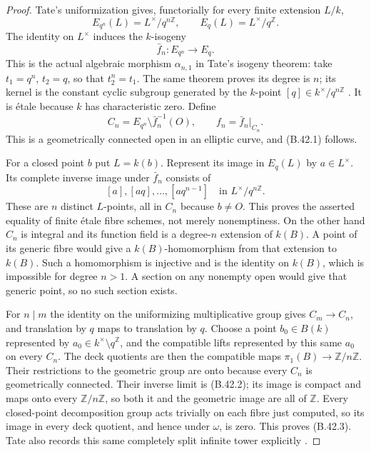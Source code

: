 \begin{proof}
Tate's uniformization gives, functorially for
every finite extension $L/k$,
\[
 E_{q^n}(L)=L^\times/q^{n\mathbb Z},
 \qquad E_q(L)=L^\times/q^{\mathbb Z}.
\]
The identity on $L^\times$ induces the
$k$-isogeny
\[
 \bar f_n:E_{q^n}\longrightarrow E_q.
\]
This is the actual algebraic morphism
$\alpha_{n,1}$ in Tate's isogeny theorem:
take $t_1=q^n$, $t_2=q$, so that
$t_2^n=t_1$. The same theorem proves its
degree is $n$; its kernel is the constant
cyclic subgroup generated by the $k$-point
$[q]\in k^\times/q^{n\mathbb Z}$
\cite[Theorem 1 and the isogeny theorem]{B_TateUniformization}.
It is \'etale because $k$ has characteristic
zero. Define
\[
 C_n=E_{q^n}\setminus\bar f_n^{-1}(O),
 \qquad f_n=\bar f_n|_{C_n}.
\]
This is a geometrically connected open in
an elliptic curve, and (B.42.1) follows.

For a closed point $b$ put $L=k(b)$.
Represent its image in $E_q(L)$ by
$a\in L^\times$. Its complete inverse image
under $\bar f_n$ consists of
\[
 [a], [aq],\ldots,[aq^{n-1}]
             \quad\text{in }L^\times/q^{n\mathbb Z}.
\]
These are $n$ distinct $L$-points, all in
$C_n$ because $b\ne O$. This proves the
asserted equality of finite \'etale fibre
schemes, not merely nonemptiness.
On the other hand $C_n$ is integral and its
function field is a degree-$n$ extension
of $k(B)$. A point of its generic fibre would
give a $k(B)$-homomorphism from that extension
to $k(B)$. Such a homomorphism is injective
and is the identity on $k(B)$, which is
impossible for degree $n>1$. A section on
any nonempty open would give that generic
point, so no such section exists.

For $n\mid m$ the identity on the
uniformizing multiplicative group gives
$C_m\to C_n$, and translation by $q$ maps
to translation by $q$. Choose a point
$b_0\in B(k)$ represented by
$a_0\in k^\times\setminus q^{\mathbb Z}$,
and the compatible lifts represented by
this same $a_0$ on every $C_n$.
The deck quotients are then the compatible
maps $\pi_1(B)\to\mathbb Z/n\mathbb Z$.
Their restrictions to the geometric group
are onto because every $C_n$ is
geometrically connected. Their inverse
limit is (B.42.2); its image is compact
and maps onto every $\mathbb Z/n\mathbb Z$,
so both it and the geometric image are
all of $\widehat{\mathbb Z}$.
Every closed-point decomposition group
acts trivially on each fibre just computed,
so its image in every deck quotient,
and hence under $\omega$, is zero.
This proves (B.42.3). Tate also records
this same completely split infinite tower
explicitly \cite[p.~18 of the author manuscript]{B_TateUniformization}.
\end{proof}

